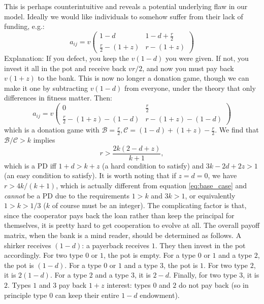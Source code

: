 \documentclass[13pt]{amsart}
\newcommand{\B}{\mathcal{B}}
\newcommand{\C}{\mathcal{C}}
\begin{document}
This is perhaps counterintuitive and reveals a potential underlying flaw in our model.
Ideally we would like individuals to somehow suffer from their lack of funding, e.g.:
\begin{equation}
    a_{ij} = v
    \begin{pmatrix}
        1-d & 1-d + \frac{r}{2} \\
        \frac{r}{2} - (1+z) & r - (1+z)
    \end{pmatrix}
\end{equation}
Explanation:
If you defect, you keep the $v(1-d)$ you were given.
If not, you invest it all in the pot and receive back $vr/2$, and now you must pay back $v(1+z)$ to the bank.
This is now no longer a donation game, though we can make it one by subtracting $v(1-d)$ from everyone, under the theory that only differences in fitness matter.
Then:
\begin{equation}
    a_{ij} = v
    \begin{pmatrix}
        0 & \frac{r}{2} \\
        \frac{r}{2} - (1+z) - (1-d) & r - (1+z) - (1-d)
    \end{pmatrix}
\end{equation}
which is a donation game with $\B = \frac{r}{2}, \C = (1-d) + (1+z) - \frac{r}{2}$.
We find that $\B/\C > k$ implies
\begin{equation}
    r > \frac{2k(2 - d + z)}{k+1},
\end{equation}
which is a PD iff $1+d > k+z$ (a hard condition to satisfy) and $3k - 2d + 2z > 1$ (an easy condition to satisfy).
It is worth noting that if $z = d = 0$, we have $r > 4k/(k+1)$, which is actually different from equation \ref{eq:base_case} and \emph{cannot} be a PD due to the requirements $1 > k$ and $3k > 1$, or equivalently $1 > k > 1/3$ ($k$ of course must be an integer).
The complicating factor is that, since the cooperator pays back the loan rather than keep the principal for themselves, it is pretty hard to get cooperation to evolve at all.
The overall payoff matrix, when the bank is a mind reader, should be determined as follows.
A shirker receives $(1-d)$: a payerback receives $1$.
They then invest in the pot accordingly.
For two type $0$ or $1$, the pot is empty.
For a type $0$ or $1$ and a type $2$, the pot is $(1-d)$.
For a type $0$ or $1$ and a type $3$, the pot is $1$.
For two type $2$, it is $2(1-d)$.
For a type $2$ and a type $3$, it is $2-d$.
Finally, for two type $3$, it is $2$.
Types $1$ and $3$ pay back $1 + z$ interest: types $0$ and $2$ do not pay back (so in principle type $0$ can keep their entire $1-d$ endowment).
\end{document}
